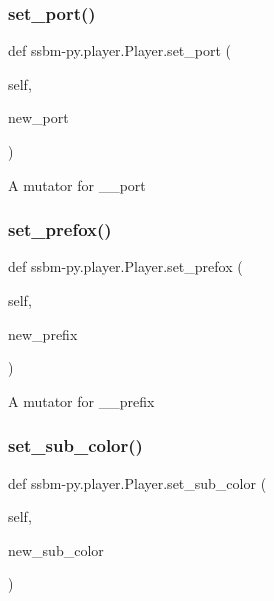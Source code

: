 \subsubsection{\texorpdfstring{set\+\_\+port()}{set\_port()}}
{\footnotesize\ttfamily def ssbm-\/py.\+player.\+Player.\+set\+\_\+port (\begin{DoxyParamCaption}\item[{}]{self,  }\item[{}]{new\+\_\+port }\end{DoxyParamCaption})}

\begin{DoxyVerb}A mutator for __port \end{DoxyVerb}
 \mbox{\label{classssbm-py_1_1player_1_1_player_a48cacf185c1cb9741d9b5bbd808df68c}} 
\subsubsection{\texorpdfstring{set\+\_\+prefox()}{set\_prefox()}}
{\footnotesize\ttfamily def ssbm-\/py.\+player.\+Player.\+set\+\_\+prefox (\begin{DoxyParamCaption}\item[{}]{self,  }\item[{}]{new\+\_\+prefix }\end{DoxyParamCaption})}

\begin{DoxyVerb}A mutator for __prefix \end{DoxyVerb}
 \mbox{\label{classssbm-py_1_1player_1_1_player_a6489819d117a20bc66da65479679e931}} 
\subsubsection{\texorpdfstring{set\+\_\+sub\+\_\+color()}{set\_sub\_color()}}
{\footnotesize\ttfamily def ssbm-\/py.\+player.\+Player.\+set\+\_\+sub\+\_\+color (\begin{DoxyParamCaption}\item[{}]{self,  }\item[{}]{new\+\_\+sub\+\_\+color }\end{DoxyParamCaption})}

